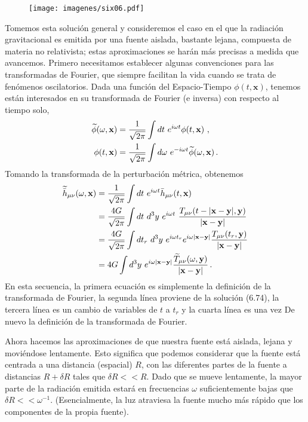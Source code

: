\documentclass[11pt,b5paper,openany,twoside]{book}
\newcommand{\mn}{{\mu\nu}}
\def\bh{{\bar h}}
\def\x{\mathbf{x}}
\def\y{\mathbf{y}}
\begin{document}
\begin{figure}[h]
\centering
\texttt{[image: imagenes/six06.pdf]}
\end{figure}

Tomemos esta solución general y consideremos el caso en el que la radiación gravitacional es emitida por una fuente aislada, bastante lejana, compuesta de materia no relativista; estas aproximaciones se harán más precisas a medida que avancemos.
Primero necesitamos establecer algunas convenciones para las transformadas de Fourier, que siempre facilitan la vida cuando se trata de fenómenos oscilatorios.
Dada una función del Espacio-Tiempo $\phi(t,\x)$, tenemos
están interesados en su transformada de Fourier (e inversa) con respecto al tiempo solo,
\begin{align}
\widetilde\phi(\omega,\x)  &=  {{1}\over{\sqrt{2\pi}}}\int
dt~e^{i\omega t}\phi(t,\x)\ , \notag \\
\phi(t,\x)  &=  {{1}\over{\sqrt{2\pi}}}\int d\omega~e^{-i\omega t}
\widetilde\phi(\omega,\x)\,. \label{6.76}
\end{align}
Tomando la transformada de la perturbación métrica, obtenemos
\begin{align}
\widetilde\bh_\mn(\omega,\x)  &=  {{1}\over{\sqrt{2\pi}}}
\int dt~e^{i\omega t}\bh_\mn(t,\x) \notag \\
&=  {{4G}\over{\sqrt{2\pi}}}\int dt~ d^3y~e^{i\omega t}~
{{T_\mn(t-|\x-\y |,\y)}\over {|\x-\y |}} \notag \\
&=  {{4G}\over{\sqrt{2\pi}}}\int dt_r~d^3y~e^{i\omega t_r}
e^{i\omega |\x-\y |}{{T_\mn(t_r,\y)}\over {|\x-\y |}} \notag \\
&=  4G \int d^3y~e^{i\omega |\x-\y |}{{\widetilde T_\mn(\omega,\y)}
\over {|\x-\y |}}\,. \label{6.77}
\end{align}
En esta secuencia, la primera ecuación es simplemente la definición de la transformada de Fourier, la segunda línea proviene de la solución (6.74), la tercera línea es un cambio de variables de $t$ a $t_r$ y la cuarta línea es una vez De nuevo la definición de la transformada de Fourier.

Ahora hacemos las aproximaciones de que nuestra fuente está aislada, lejana y moviéndose lentamente.
Esto significa que podemos considerar que la fuente está centrada a una distancia (espacial) $R$, con las diferentes partes de la fuente a distancias $R+\delta R$ tales que $\delta R << R$.
Dado que se mueve lentamente, la mayor parte de la radiación emitida estará en frecuencias $\omega$ suficientemente bajas que $\delta R<<\omega^{-1}$.
(Esencialmente, la luz atraviesa la fuente mucho más rápido que los componentes de la propia fuente).
\end{document}
